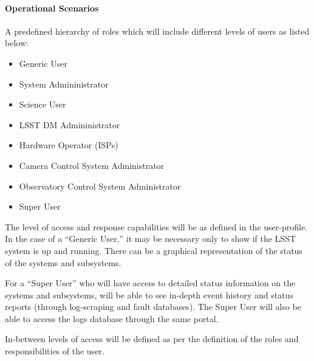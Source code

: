 \paragraph{Operational Scenarios}

A predefined hierarchy of roles which will include different levels of users as 
listed below:

\begin{itemize}

\item Generic User
\item System Admininistrator
\item Science User
\item LSST DM Admininistrator
\item Hardware Operator (ISPs)
\item Camera Control System Administrator
\item Observatory Control System Administrator
\item Super User

\end{itemize}

The level of access and response capabilities will be as defined in the 
user-profile. In the case of a ``Generic User,'' it may be necessary only to show 
if the LSST system is up and running. There can be a graphical representation of 
the status of the systems and subsystems. 

For a ``Super User'' who will have access to detailed status information on the 
systems and subsystems, will be able to see in-depth event history and status 
reports (through log-scraping and fault databases). The Super User will also be 
able to access the logs database through the same portal.

In-between levels of access will be defined as per the definition of the roles 
and responsibilities of the user.
